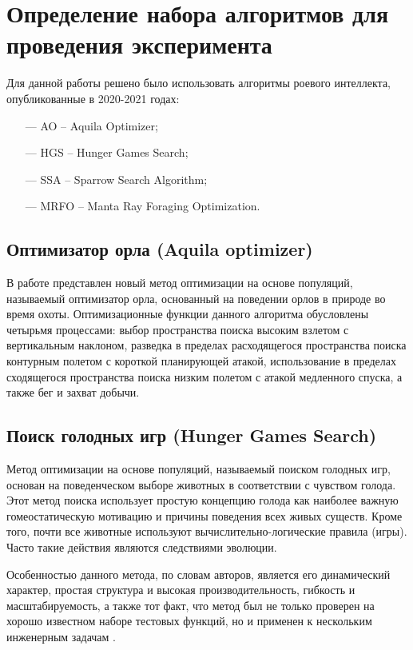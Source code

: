 \section{Определение набора алгоритмов для проведения эксперимента}\label{BIOAlgs}

Для данной работы решено было использовать алгоритмы роевого интеллекта, опубликованные в 2020-2021 годах:

\begin{itemize}
    \item[—] AO -- Aquila Optimizer;
    \item[—] HGS -- Hunger Games Search;
    \item[—] SSA -- Sparrow Search Algorithm;
    \item[—] MRFO -- Manta Ray Foraging Optimization.
\end{itemize}

\subsection{Оптимизатор орла (Aquila optimizer)}\label{AO}

В работе \cite{AO} представлен новый метод оптимизации на основе популяций, называемый оптимизатор орла,
основанный на поведении орлов в природе во время охоты. Оптимизационные функции
данного алгоритма обусловлены четырьмя процессами: выбор пространства поиска высоким
взлетом с вертикальным наклоном, разведка в пределах расходящегося пространства поиска
контурным полетом с короткой планирующей атакой, использование в пределах сходящегося пространства
поиска низким полетом с атакой медленного спуска, а также бег и захват добычи.

\subsection{Поиск голодных игр (Hunger Games Search)}\label{HGS}

Метод оптимизации на основе популяций, называемый поиском голодных игр, основан на поведенческом выборе
животных в соответствии с чувством голода. Этот метод поиска использует простую концепцию голода как наиболее
важную гомеостатическую мотивацию и причины поведения всех живых существ. Кроме того, почти все животные используют вычислительно-логические
правила (игры). Часто такие действия являются следствиями эволюции.

Особенностью данного метода, по словам авторов, является его динамический характер, простая структура и
высокая производительность, гибкость и масштабируемость, а также тот факт, что метод был не только
проверен на хорошо известном наборе тестовых функций, но и применен к нескольким инженерным задачам \cite{HGS}.

